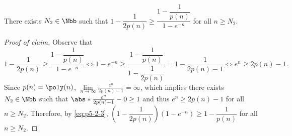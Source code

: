 \begin{answer}[ii]
    \begin{claim}\label{claim:p5-2-5}
        There exists $N_2\in\Nbb$ such that $1-\dfrac{1}{2p(n)}\ge \dfrac{1-\dfrac{1}{p(n)}}{1-e^{-n}}$ for all $n\ge N_2$. 
    \end{claim}
    \begin{proof}[Proof of claim]
        Observe that
        \begin{equation}\label{eq:p5-2-3}
            1-\dfrac{1}{2p(n)}\ge \dfrac{1-\dfrac{1}{p(n)}}{1-e^{-n}}
            \iff 1-e^{-n} \ge \dfrac{1-\dfrac{1}{p(n)}}{1-\dfrac{1}{2p(n)}}
            =1-\frac{1}{2p(n)-1}
            \iff e^n \ge 2p(n)-1.
        \end{equation}
        Since $p(n)=\poly(n)$, $\lim\limits_{n\to\infty} \frac{e^n}{2p(n)-1}=\infty$, which implies there exists $N_2\in\Nbb$ such that $\abs*{\frac{e^n}{2p(n)-1}-0}\ge 1$ and thus $e^n\ge 2p(n)-1$ for all $n\ge N_2$. Therefore, by \eqref{eq:p5-2-3}, $\left(1-\dfrac{1}{2p(n)}\right)(1-e^{-n})\ge 1-\dfrac{1}{p(n)}$ for all $n\ge N_2$.
    \end{proof}


\end{answer}
